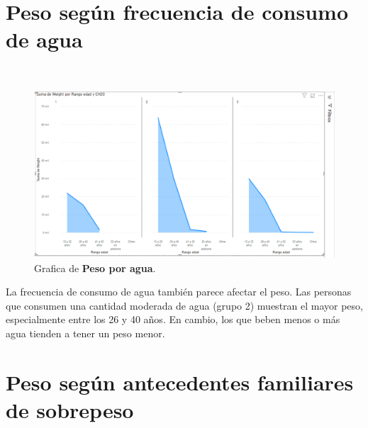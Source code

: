 \documentclass[a4paper]{report} %
\begin{document}
\section{Peso según frecuencia de consumo de agua}
\paragraph{}\mbox{} \\
\begin{figure}[htb]
                \centering
                  \includegraphics[width=\textwidth]{Images/pesoporagua.png}
                  \caption{Grafica de \textbf{Peso por agua}.}
              \end{figure} 
La frecuencia de consumo de agua también parece afectar el peso. Las personas que consumen una cantidad moderada de agua (grupo 2) muestran el mayor peso, especialmente entre los 26 y 40 años. En cambio, los que beben menos o más agua tienden a tener un peso menor.
\section{Peso según antecedentes familiares de sobrepeso}
\end{document}
